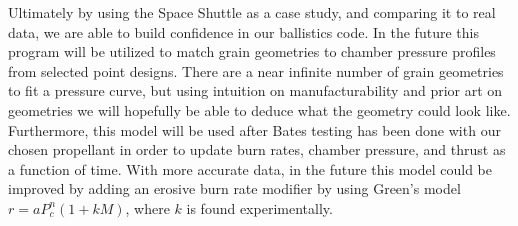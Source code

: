 Ultimately by using the Space Shuttle as a case study, and comparing it to real data, we are able to build confidence in our ballistics code. In the future this program will be utilized to match grain geometries to chamber pressure profiles from selected point designs. There are a near infinite number of grain geometries to fit a pressure curve, but using intuition on manufacturability and prior art on geometries we will hopefully be able to deduce what the geometry could look like. Furthermore, this model will be used after Bates testing has been done with our chosen propellant in order to update burn rates, chamber pressure, and thrust as a function of time. With more accurate data, in the future this model could be improved by adding an erosive burn rate modifier by using Green’s model \(r = a P_c^n (1 + k M)\), where \(k\) is found experimentally.
